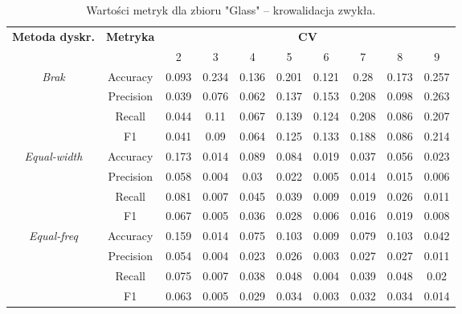 \begin{table}[H]
\center
\caption{Wartości metryk dla zbioru "Glass" -- krowalidacja zwykła.}
    \begin{tabular}{|c|c|c|c|c|c|c|c|c|c|}
        \hline
        \multirow{2}{*}{\textbf{Metoda dyskr.}} & \multirow{2}{*}{\textbf{Metryka}} & \multicolumn{8}{|c|}{\textbf{CV}} \\ \cline{3-10}
                        &  & 2 & 3 & 4 & 5 & 6 & 7 & 8 & 9 \\ \hline
        \multirow{4}{*}{\textit{Brak}}  & Accuracy & 0.093 & 0.234 & 0.136 & 0.201 & 0.121 & 0.28 & 0.173 & 0.257 \\ \cline{2-10}
                                         & Precision & 0.039 & 0.076 & 0.062 & 0.137 & 0.153 & 0.208 & 0.098 & 0.263 \\ \cline{2-10}
                                         & Recall & 0.044 & 0.11 & 0.067 & 0.139 & 0.124 & 0.208 & 0.086 & 0.207 \\ \cline{2-10}
                                         & F1 & 0.041 & 0.09 & 0.064 & 0.125 & 0.133 & 0.188 & 0.086 & 0.214 \\ \hline \hline


        \multirow{4}{*}{\textit{Equal-width}}  & Accuracy & 0.173 & 0.014 & 0.089 & 0.084 & 0.019 & 0.037 & 0.056 & 0.023 \\ \cline{2-10}
                                                 & Precision & 0.058 & 0.004 & 0.03 & 0.022 & 0.005 & 0.014 & 0.015 & 0.006 \\ \cline{2-10}
                                                 & Recall & 0.081 & 0.007 & 0.045 & 0.039 & 0.009 & 0.019 & 0.026 & 0.011 \\ \cline{2-10}
                                                 & F1 & 0.067 & 0.005 & 0.036 & 0.028 & 0.006 & 0.016 & 0.019 & 0.008 \\ \hline \hline


        \multirow{4}{*}{\textit{Equal-freq}}  & Accuracy & 0.159 & 0.014 & 0.075 & 0.103 & 0.009 & 0.079 & 0.103 & 0.042 \\ \cline{2-10}
                                             & Precision & 0.054 & 0.004 & 0.023 & 0.026 & 0.003 & 0.027 & 0.027 & 0.011 \\ \cline{2-10}
                                             & Recall & 0.075 & 0.007 & 0.038 & 0.048 & 0.004 & 0.039 & 0.048 & 0.02 \\ \cline{2-10}
                                             & F1 & 0.063 & 0.005 & 0.029 & 0.034 & 0.003 & 0.032 & 0.034 & 0.014 \\ \hline \hline



\end{tabular}
\end{table}
